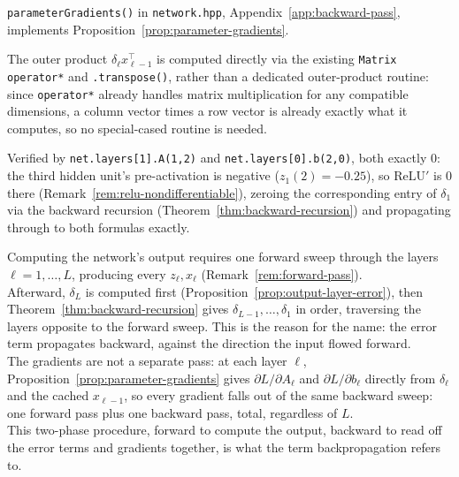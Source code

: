 		\begin{compremark}
			\texttt{parameterGradients()} in \texttt{network.hpp}, Appendix~\ref{app:backward-pass}, implements Proposition~\ref{prop:parameter-gradients}.
			
			The outer product $\delta_\ell x_{\ell-1}^\top$ is computed directly via the existing \texttt{Matrix} \texttt{operator*} and \texttt{.transpose()}, rather than a dedicated outer-product routine: since \texttt{operator*} already handles matrix multiplication for any compatible dimensions, a column vector times a row vector is already exactly what it computes, so no special-cased routine is needed.
			
			Verified by \texttt{net.layers[1].A(1,2)} and \texttt{net.layers[0].b(2,0)}, both exactly $0$: the third hidden unit's pre-activation is negative ($z_1(2)=-0.25$), so $\mathrm{ReLU}'$ is $0$ there (Remark~\ref{rem:relu-nondifferentiable}), zeroing the corresponding entry of $\delta_1$ via the backward recursion (Theorem~\ref{thm:backward-recursion}) and propagating through to both formulas exactly.
		\end{compremark}
		
		\begin{remark}[Backpropagation]
			\label{rem:backpropagation}
			Computing the network's output requires one forward sweep through the layers $\ell=1,\dots,L$, producing every $z_\ell,x_\ell$ (Remark~\ref{rem:forward-pass}). \\
			
			Afterward, $\delta_L$ is computed first (Proposition~\ref{prop:output-layer-error}), then Theorem~\ref{thm:backward-recursion} gives $\delta_{L-1},\dots,\delta_1$ in order, traversing the layers opposite to the forward sweep. This is the reason for the name: the error term propagates backward, against the direction the input flowed forward. \\
			
			The gradients are not a separate pass: at each layer $\ell$, Proposition~\ref{prop:parameter-gradients} gives $\partial L/\partial A_\ell$ and $\partial L/\partial b_\ell$ directly from $\delta_\ell$ and the cached $x_{\ell-1}$, so every gradient falls out of the same backward sweep: one forward pass plus one backward pass, total, regardless of $L$. \\
			
			This two-phase procedure, forward to compute the output, backward to read off the error terms and gradients together, is what the term backpropagation refers to.
		\end{remark}
	
